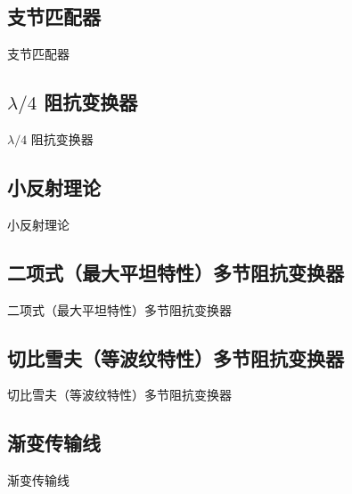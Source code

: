 \subsection{支节匹配器}
\begin{frame}{支节匹配器}

\end{frame}

\subsection{$\lambda/4$ 阻抗变换器}
\begin{frame}{$\lambda/4$ 阻抗变换器}

\end{frame}

\subsection{小反射理论}
\begin{frame}{小反射理论}

\end{frame}

\subsection{二项式（最大平坦特性）多节阻抗变换器}
\begin{frame}{二项式（最大平坦特性）多节阻抗变换器}

\end{frame}

\subsection{切比雪夫（等波纹特性）多节阻抗变换器}
\begin{frame}{切比雪夫（等波纹特性）多节阻抗变换器}

\end{frame}

\subsection{渐变传输线}
\begin{frame}{渐变传输线}

\end{frame}
